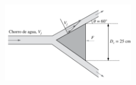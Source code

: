 \documentclass[11pt]{report}
\begin{document}
\begin{figure}[H]
\centering\includegraphics[width=0.5\textwidth]{Figures/p5.png}
\caption{\label{fig:fig5}}
\end{figure}


%
%

%
%
%
%

\end{document}
